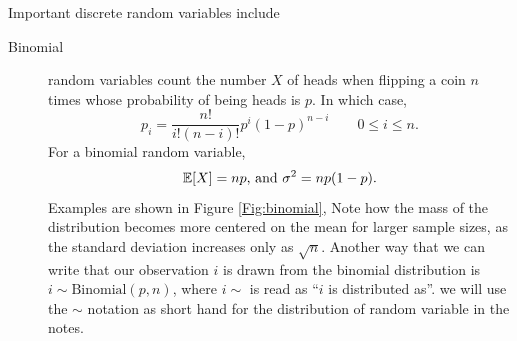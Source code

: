 Important discrete random variables include
\begin{description}
\item[Binomial]  random variables count the number $X$ of heads when
  flipping a coin $n$ times whose probability of being heads is $p$. In which case, 
\begin{equation}
  p_i = \frac{n!}{i!(n-i)!} p^i (1-p)^{n-i} \qquad 0\le i \le n. \label{eqn:binomial_dist}
\end{equation}
For a binomial random variable,
\begin{equation}
  \mathbb{E}[X]=np \textrm{, and } \sigma^2=np(1-p).
\end{equation}
  Examples are shown in Figure \ref{Fig:binomial}, Note how the mass of the
   distribution becomes more centered on the mean for larger sample
   sizes, as the standard deviation increases only as $\sqrt{n}$. 
Another way that we can write that our observation $i$ is drawn from
the binomial distribution is $i \sim
\textrm{Binomial}(p,n)$, where $i \sim$ is read as ``$i$ is
distributed as''. we will use the $\sim$ notation as short hand for
the distribution of random
variable in the notes.


\end{description}

